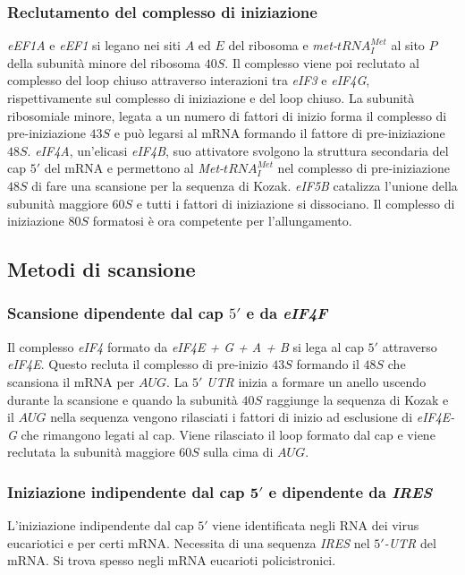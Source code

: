 \subsubsection{Reclutamento del complesso di iniziazione}
\emph{eEF1A} e \emph{eEF1} si legano nei siti $A$ ed $E$ del ribosoma e \emph{met-$tRNA_I^{Met}$} al sito $P$ della subunit\`a minore del ribosoma $40S$. Il complesso viene poi reclutato 
al complesso del loop chiuso attraverso interazioni tra \emph{eIF3} e \emph{eIF4G}, rispettivamente sul complesso di iniziazione e del loop chiuso. La subunit\`a ribosomiale minore, legata a un
numero di fattori di inizio forma il complesso di pre-iniziazione $43S$ e pu\`o legarsi al mRNA formando il fattore di pre-iniziazione $48S$. \emph{eIF4A}, un'elicasi \emph{eIF4B}, suo attivatore 
svolgono la struttura secondaria del cap $5'$ del mRNA e permettono al \emph{Met-$tRNA_I^{Met}$} nel complesso di pre-iniziazione $48S$ di fare una scansione per la sequenza di Kozak. \emph{eIF5B} 
catalizza l'unione della subunit\`a maggiore $60S$ e tutti i fattori di iniziazione si dissociano. Il complesso di iniziazione $80S$ formatosi \`e ora competente per l'allungamento. 
\subsection{Metodi di scansione}
\subsubsection{Scansione dipendente dal cap $5'$ e da \emph{eIF4F}}
Il complesso \emph{eIF4} formato da \emph{eIF4E + G + A + B} si lega al cap $5'$ attraverso \emph{eIF4E}. Questo recluta il complesso di pre-inizio $43S$ formando il $48S$ che scansiona il mRNA 
per $AUG$. La $5'$ \emph{UTR} inizia a formare un anello uscendo durante la scansione e quando la subunit\`a $40S$ raggiunge la sequenza di Kozak e il $AUG$ nella sequenza vengono rilasciati i fattori
di inizio ad esclusione di \emph{eIF4E-G} che rimangono legati al cap. Viene rilasciato il loop formato dal cap e viene reclutata la subunit\`a maggiore $60S$ sulla cima di $AUG$. 
\subsubsection{Iniziazione indipendente dal cap $\mathbf{5'}$ e dipendente da \emph{IRES}}
L'iniziazione indipendente dal cap $5'$ viene identificata negli RNA dei virus eucariotici e per certi mRNA. Necessita di una sequenza \emph{IRES} nel \emph{$5'$-UTR} del mRNA. Si trova spesso negli 
mRNA eucarioti policistronici.
